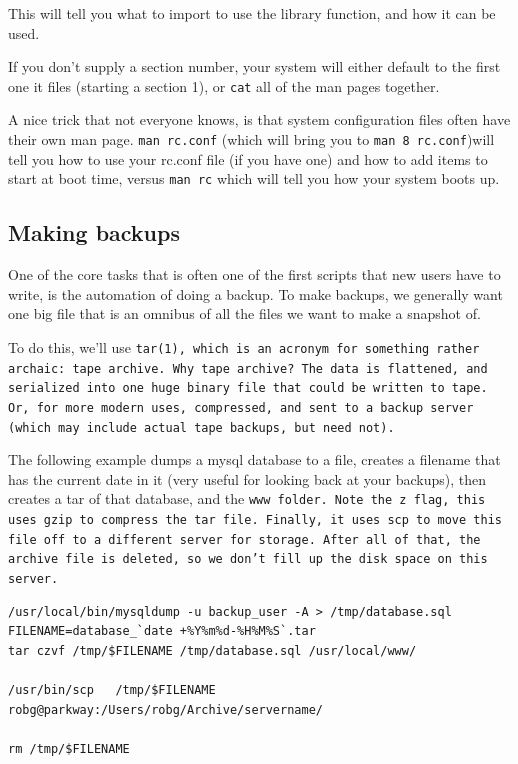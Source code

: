This will tell you what to import to use the library function, and how it 
can be used.

If you don't supply a section number, your system will either default to the first one it files (starting a section 1), or {\tt cat}
all of the man pages together.

A nice trick that not everyone knows, is that system configuration files 
often have their own man page. {\tt man rc.conf} (which will bring you to {\tt man 8 rc.conf})will tell you 
how to use your rc.conf file (if you have one) and how to add items to start at boot time, versus {\tt man rc}
which will tell you how your system boots up.


\subsection {Making backups}

One of the core tasks that is often one of the first scripts that new users
have to write, is the automation of doing a backup. To make backups, we generally
want one big file that is an omnibus of all the files we want to make a snapshot
of.

To do this, we'll use \tt{tar(1)}, which is an acronym for something rather archaic:
tape archive. Why tape archive? The data is flattened, and serialized into one huge
binary file that could be written to tape. Or, for more modern uses, compressed, and
sent to a backup server (which may include actual tape backups, but need not).

The following example dumps a mysql database to a file, creates a filename that
has the current date in it (very useful for looking back at your backups), then
creates a tar of that database, and the \tt{www} folder. Note the \tt{z} flag,
this uses \tt{gzip} to compress the tar file. Finally, it uses
\tt{scp} to move this file off to a different server for storage.  After all of that,
the archive file is deleted, so we don't fill up the disk space on this server.

\begin{verbatim}
/usr/local/bin/mysqldump -u backup_user -A > /tmp/database.sql
FILENAME=database_`date +%Y%m%d-%H%M%S`.tar
tar czvf /tmp/$FILENAME /tmp/database.sql /usr/local/www/

/usr/bin/scp   /tmp/$FILENAME robg@parkway:/Users/robg/Archive/servername/

rm /tmp/$FILENAME
\end{verbatim}

